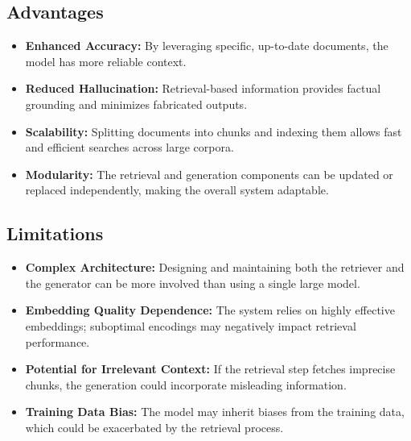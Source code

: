 \documentclass[conference]{IEEEtran}
\begin{document}
\subsection{Advantages}
\begin{itemize}
    \item \textbf{Enhanced Accuracy:} By leveraging specific, up-to-date documents, the model has more reliable context.
    \item \textbf{Reduced Hallucination:} Retrieval-based information provides
          factual grounding and minimizes fabricated outputs.
    \item \textbf{Scalability:} Splitting documents into chunks and indexing them allows fast and efficient searches across large corpora.
    \item \textbf{Modularity:} The retrieval and generation components can be updated or replaced independently, making the overall system adaptable.
\end{itemize}

\subsection{Limitations}
\begin{itemize}
    \item \textbf{Complex Architecture:} Designing and maintaining both the retriever and the generator can be more involved than using a single large model.
    \item \textbf{Embedding Quality Dependence:} The system relies on highly effective embeddings; suboptimal encodings may negatively impact retrieval performance.
    \item \textbf{Potential for Irrelevant Context:} If the retrieval step fetches imprecise chunks, the generation could incorporate misleading information.
    \item \textbf{Training Data Bias:} The model may inherit biases from the training data, which could be exacerbated by the retrieval process.
\end{itemize}
\end{document}
